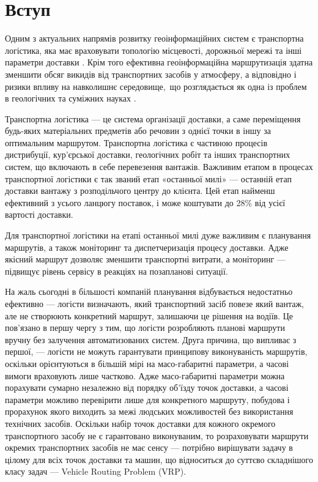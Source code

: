 \section{Вступ}
Одним з актуальних напрямів розвитку геоінформаційних систем є транспортна логістика, яка має враховувати топологію місцевості, дорожньої мережі та інші параметри доставки \cite{Markelov_2015}. Крім того ефективна геоінформаційна маршрутизація здатна зменшити обсяг викидів від транспортних засобів у атмосферу, а відповідно і ризики впливу на навколишнє середовище, що розглядається як одна із проблем в геологічних та суміжних науках \cite{Zhukov_2013}.

Транспортна логістика --- це система організації доставки, а саме переміщення будь-яких матеріальних предметів або речовин з однієї точки в іншу за оптимальним маршрутом. Транспортна логістика є частиною процесів дистрибуції, кур’єрської доставки, геологічних робіт та інших транспортних систем, що включають в себе перевезення вантажів. Важливим етапом в процесах транспортної логістики є так званий етап «останньої милі» --- останній етап доставки вантажу з розподільчого центру до клієнта. Цей етап найменш ефективний з усього ланцюгу поставок, і може коштувати до 28\% від усієї вартості доставки. \cite{Scott_2009}

Для транспортної логістики на етапі останньої милі дуже важливим є планування маршрутів, а також моніторинг та диспетчеризація процесу доставки. Адже якісний маршрут дозволяє зменшити транспортні витрати, а моніторинг --- підвищує рівень сервісу в реакціях на позапланові ситуації. 

На жаль сьогодні в більшості компаній планування відбувається недостатньо ефективно --- логісти визначають, який транспортний засіб повезе який вантаж, але не створюють конкретний маршрут, залишаючи це рішення на водіїв. Це пов’язано в першу чергу з тим, що логісти розробляють планові маршрути вручну без залучення автоматизованих систем. Друга причина, що випливає з першої, --- логісти не можуть гарантувати принципову виконуваність маршрутів, оскільки орієнтуються в більшій мірі на масо-габаритні параметри, а часові вимоги враховують лише частково. Адже масо-габаритні параметри можна порахувати сумарно незалежно від порядку об’їзду точок доставки, а часові параметри можливо перевірити лише для конкретного маршруту, побудова і прорахунок якого виходить за межі людських можливостей без використання технічних засобів. Оскільки набір точок доставки для кожного окремого транспортного засобу не є гарантовано виконуваним, то розраховувати маршрути окремих транспортних засобів не має сенсу --- потрібно вирішувати задачу в цілому для всіх точок доставки та машин, що відноситься до суттєво складнішого класу задач --- Vehicle Routing Problem (VRP).

